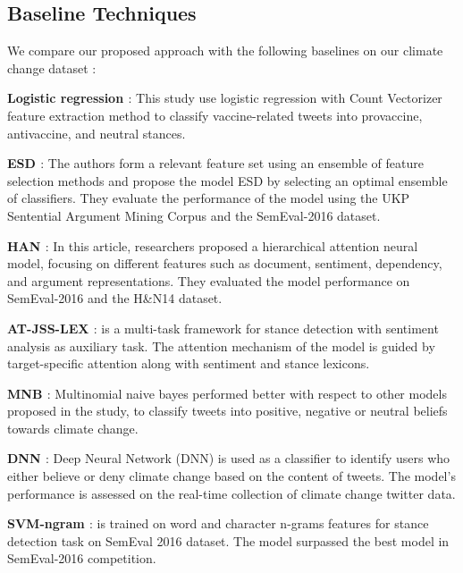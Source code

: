 \documentclass[letterpaper]{article} %
\begin{document}
\subsection{Baseline Techniques} \label{baselines_section}
We compare our proposed approach with the following baselines on our climate change dataset :
\par\noindent\textbf{Logistic regression \cite{argyris2021using}}: This study use logistic regression with Count Vectorizer feature extraction method to classify vaccine-related tweets into provaccine, antivaccine, and neutral stances.

\par\noindent\textbf{ESD \cite{vychegzhanin2021new}}: The authors form a relevant feature set using an ensemble of feature selection methods and propose the model ESD by selecting an optimal ensemble of classifiers. They evaluate the performance of the model using the UKP Sentential Argument Mining Corpus and the SemEval-2016 dataset.

\par\noindent\textbf{HAN \cite{wang2020neural}}: In this article, researchers proposed a hierarchical attention neural model, focusing on different features such as document, sentiment, dependency, and argument representations. They evaluated the model performance on SemEval-2016 and the H\&N14 dataset.

\par\noindent\textbf{AT-JSS-LEX \cite{li2019multi}}: is a multi-task framework for stance detection with sentiment analysis as auxiliary task. The attention mechanism of the model is guided by target-specific attention along with sentiment and stance lexicons.

\par\noindent\textbf{MNB \cite{kabaghe66classifying}}: Multinomial naive bayes performed better with respect to other models proposed in the study, to classify tweets into positive, negative or neutral beliefs towards climate change.

\par\noindent\textbf{DNN \cite{chen2019detecting}}: Deep Neural Network (DNN) is used as a classifier to identify users who either believe or deny climate change based on the content of tweets. The model's performance is assessed on the real-time collection of climate change twitter data.
\par\noindent\textbf{SVM-ngram \cite{sobhani2016detecting}}: is trained on word and character n-grams features for stance detection task on SemEval 2016 dataset. The model surpassed the best model in SemEval-2016 competition.
\end{document}
